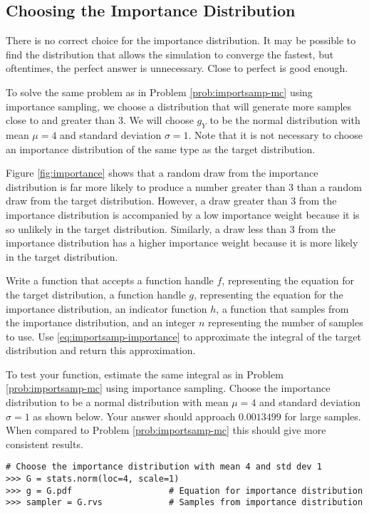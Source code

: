 \subsection*{Choosing the Importance Distribution} %

There is no correct choice for the importance distribution.
It may be possible to find the distribution that allows the simulation to converge the fastest, but oftentimes, the perfect answer is unnecessary.
Close to perfect is good enough.

To solve the same problem as in Problem \ref{prob:importsamp-mc} using importance sampling, we choose a distribution that will generate more samples close to and greater than 3.
We will choose $g_Y$ to be the normal distribution with mean $\mu = 4$ and standard deviation $\sigma = 1$.
Note that it is not necessary to choose an importance distribution of the same type as the target distribution.

Figure \ref{fig:importance} shows that a random draw from the importance distribution is far more likely to produce a number greater than 3 than a random draw from the target distribution.
However, a draw greater than 3 from the importance distribution is accompanied by a low importance weight because it is so unlikely in the target distribution.
Similarly, a draw less than 3 from the importance distribution has a higher importance weight because it is more likely in the target distribution.

\begin{problem} \label{prob:importsamp-mc_important}
Write a function that accepts a function handle $f$, representing the equation for the target distribution, a function handle $g$, representing the equation for the importance distribution, an indicator function $h$, a function that samples from the importance distribution, and an integer $n$ representing the number of samples to use.
Use \eqref{eq:importsamp-importance} to approximate the integral of the target distribution and return this approximation.

To test your function, estimate the same integral as in Problem \ref{prob:importsamp-mc} using importance sampling.
Choose the importance distribution to be a normal distribution with mean $\mu = 4$ and standard deviation $\sigma = 1$ as shown below.
Your answer should approach $0.0013499$ for large samples.
When compared to Problem \ref{prob:importsamp-mc} this should give more consistent results.

\begin{lstlisting}
# Choose the importance distribution with mean 4 and std dev 1
>>> G = stats.norm(loc=4, scale=1)
>>> g = G.pdf                   # Equation for importance distribution
>>> sampler = G.rvs             # Samples from importance distribution
\end{lstlisting}

\end{problem}

